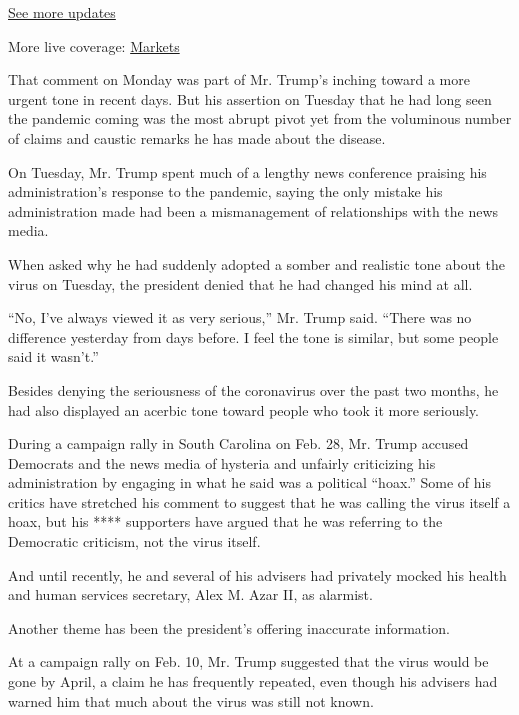 \href{https://www.nytimes3xbfgragh.onion/2020/09/11/world/covid-19-coronavirus.html?action=click\&pgtype=Article\&state=default\&region=MAIN_CONTENT_1\&context=storylines_live_updates}{See
more updates}

More live coverage:
\href{https://www.nytimes3xbfgragh.onion/live/2020/09/11/business/stock-market-today-coronavirus?action=click\&pgtype=Article\&state=default\&region=MAIN_CONTENT_1\&context=storylines_live_updates}{Markets}

That comment on Monday was part of Mr. Trump's inching toward a more
urgent tone in recent days. But his assertion on Tuesday that he had
long seen the pandemic coming was the most abrupt pivot yet from the
voluminous number of claims and caustic remarks he has made about the
disease.

On Tuesday, Mr. Trump spent much of a lengthy news conference praising
his administration's response to the pandemic, saying the only mistake
his administration made had been a mismanagement of relationships with
the news media.

When asked why he had suddenly adopted a somber and realistic tone about
the virus on Tuesday, the president denied that he had changed his mind
at all.

``No, I've always viewed it as very serious,'' Mr. Trump said. ``There
was no difference yesterday from days before. I feel the tone is
similar, but some people said it wasn't.''

Besides denying the seriousness of the coronavirus over the past two
months, he had also displayed an acerbic tone toward people who took it
more seriously.

During a campaign rally in South Carolina on Feb. 28, Mr. Trump accused
Democrats and the news media of hysteria and unfairly criticizing his
administration by engaging in what he said was a political ``hoax.''
Some of his critics have stretched his comment to suggest that he was
calling the virus itself a hoax, but his **** supporters have argued
that he was referring to the Democratic criticism, not the virus itself.

And until recently, he and several of his advisers had privately mocked
his health and human services secretary, Alex M. Azar II, as alarmist.

Another theme has been the president's offering inaccurate information.

At a campaign rally on Feb. 10, Mr. Trump suggested that the virus would
be gone by April, a claim he has frequently repeated, even though his
advisers had warned him that much about the virus was still not known.

